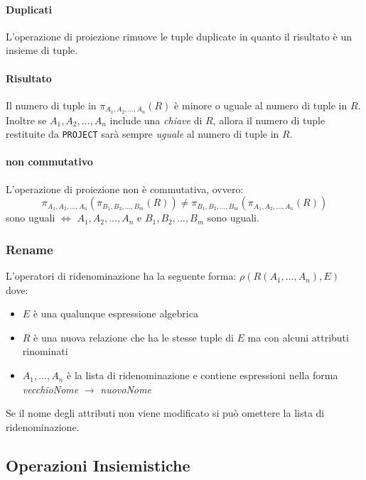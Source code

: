             \paragraph{Duplicati} L'operazione di proiezione rimuove le tuple duplicate in quanto il risultato è un insieme di tuple.
            \paragraph{Risultato} Il numero di tuple in $ \pi_{A_1, A_2, \dots, A_n} (R) $ è minore o uguale al numero di tuple in $R$. Inoltre se $ A_1, A_2, \dots, A_n $ include una \textit{chiave} di $ R $, allora il numero di tuple restituite da \texttt{PROJECT} sarà sempre \textit{uguale} al numero di tuple in $ R $.
            \paragraph{non commutativo} L'operazione di proiezione non è commutativa, ovvero:
                $$
                    \pi_{A_1, A_2, \dots, A_n} ( \pi_{B_1, B_2, \dots, B_m} (R) ) \neq \pi_{B_1, B_2, \dots, B_m} ( \pi_{A_1, A_2, \dots, A_n} (R) )
                $$
                sono uguali $ \Leftrightarrow $ $ A_1, A_2, \dots, A_n $ e $ B_1, B_2, \dots, B_m $ sono uguali.
        \subsubsection{Rename}
            L'operatori di ridenominazione ha la seguente forma: $ \rho(R(A_1,\dots,A_n), E)$
            dove:
            \begin{itemize}
                \item $ E $ è una qualunque espressione algebrica
                \item $ R $ è una nuova relazione che ha le stesse tuple di $ E $ ma con alcuni attributi rinominati
                \item $ A_1,\dots,A_n $ è la lista di ridenominazione e contiene espressioni nella forma \textit{vecchioNome} $\rightarrow$ \textit{nuovoNome}
            \end{itemize}
            Se il nome degli attributi non viene modificato si può omettere la lista di ridenominazione.
    \subsection{Operazioni Insiemistiche}
